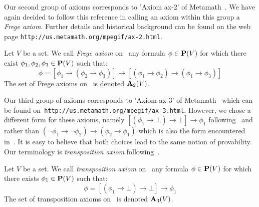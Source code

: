 Our second group of axioms corresponds to 'Axiom ax-2' of
Metamath~\cite{Metamath}. We have again decided to follow this
reference in calling an axiom within this group a {\em Frege axiom}.
Further details and historical background can be found on the web
page \texttt{http://us.metamath.org/mpegif/ax-2.html}.
\begin{defin}\label{logic:def:FOPL:frege:axiom}
Let $V$ be a set. We call {\em Frege axiom} on \pv\ any formula
$\phi\in\mbox{${\bf P}(V)$}$ for which there exist
$\phi_{1},\phi_{2},\phi_{3}\in\mbox{${\bf P}(V)$}$ such that:
    \[
    \phi =
    [\phi_{1}\to(\phi_{2}\to\phi_{3})]\to[(\phi_{1}\to\phi_{2})\to(\phi_{1}\to\phi_{3})]
    \]
The set of Frege axioms on \pv\ is denoted ${\bf A}_{2}(V)$.
\end{defin}

Our third group of axioms corresponds to 'Axiom ax-3' of
Metamath~\cite{Metamath} which can be found
on~\texttt{http://us.metamath.org/mpegif/ax-3.html}. However, we
chose a different form for these axioms, namely
$[(\phi_{1}\to\bot)\to\bot]\to\phi_{1}$ following~\cite{AlgLog}
and~\cite{Johnstone} rather than
$(\lnot\phi_{1}\to\lnot\phi_{2})\to(\phi_{2}\to\phi_{1})$ which is
also the form encountered in~\cite{Ferenczi}. It is easy to believe
that both choices lead to the same notion of provability. Our
terminology is {\em transposition axiom} following~\cite{Metamath}.
\begin{defin}\label{logic:def:FOPL:transposition:axiom}
Let $V$ be a set. We call {\em transposition axiom} on \pv\ any
formula $\phi\in\mbox{${\bf P}(V)$}$ for which there exists $\phi_{1}\in\mbox{${\bf P}(V)$}$ such
that:
    \[
    \phi =[(\phi_{1}\to\bot)\to\bot]\to\phi_{1}
    \]
The set of transposition axioms on \pv\ is denoted ${\bf A}_{3}(V)$.
\end{defin}

